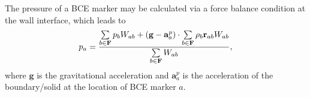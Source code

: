 

The pressure of a BCE marker may be calculated via a force balance condition at the wall interface, which leads to \cite{Adami2012}
\begin{equation} \label{eq:pBCE_Adami}
p_a = \frac{\sum\limits_{b \in \bf F} {p_b W_{ab}} + \left( \mathbf{g} - \mathbf{a}_a^p \right) \cdot \sum\limits_{b \in \bf F} {\rho_b \mathbf{r}_{ab} W_{ab} }}{\sum\limits_{b \in \bf F} {W_{ab}}},
\end{equation}
where $\mathbf{g}$ is the gravitational acceleration and $\mathbf{a}_a^p$ is the acceleration of the boundary/solid at the location of BCE marker $a$.

